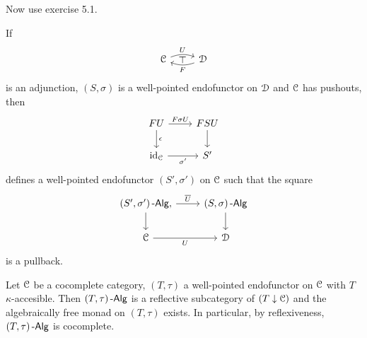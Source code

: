 \documentclass[a4paper,11pt,oneside,openany]{scrbook}
\begin{document}
Now use exercise 5.1.
\begin{prop}
	If
	\begin{displaymath}
		\begin{tikzcd}
			\C \arrow[r, "U", bend left=20]
			\arrow[from=r, "F", bend left=20]
			\arrow[r, phantom, "\top"]
			& \D
		\end{tikzcd}
	\end{displaymath}
	is an adjunction, $ (S,\sigma) $ is a well-pointed endofunctor on $ \operatorname{\mathcal{D}} $
	and $ \operatorname{\mathcal{C}} $ has pushouts, then
	\begin{displaymath}
		\begin{tikzcd}
			FU \arrow[r,"F\sigma U"]\arrow[d, "\epsilon"]& FSU \arrow[d]\\
			\id_{\C} \arrow[r, "\sigma'"']& S'
		\end{tikzcd}
	\end{displaymath}
	defines a well-pointed endofunctor $ (S',\sigma') $ on $ \operatorname{\mathcal{C}} $ such that the square
	\begin{displaymath}
		\begin{tikzcd}
			(S',\sigma')\Alg \arrow[r, "\overline U"],\arrow[d]
			& (S,\sigma)\Alg \arrow[d]\\
			\C \arrow[r, "U"'] & \D
		\end{tikzcd}
	\end{displaymath}
	is a pullback.\hfill\qedsymbol
\end{prop}
\begin{thm}
	Let $ \operatorname{\mathcal{C}} $ be a cocomplete category, $ (T,\tau) $ a well-pointed endofunctor on $ \operatorname{\mathcal{C}} $ with $ T $ $ \kappa $-accesible.
	Then $ (T,\tau)\operatorname{-\mathsf{Alg}} $ is a reflective subcategory of $ (T\downarrow\operatorname{\mathcal{C}})$ and the algebraically free monad on $ (T,\tau) $ exists. In particular, by reflexiveness, $ (T,\tau)\operatorname{-\mathsf{Alg}} $ is cocomplete.
\end{thm}
\end{document}
